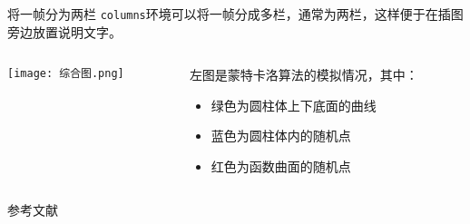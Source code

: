 \documentclass[14pt,hyperref={CJKbookmarks=true}]{beamer} %
\begin{document}
\begin{frame}{将一帧分为两栏}
    \texttt{columns}环境可以将一帧分成多栏，通常为两栏，这样便于在插图旁边放置说明文字。
    \begin{columns}[onlytextwidth]  %
        \begin{column}{0.55\textwidth}
            \texttt{[image: 综合图.png]}
        \end{column}
        \begin{column}{0.45\textwidth}
            左图是蒙特卡洛算法的模拟情况，其中：
            \begin{itemize}
                \item  绿色为圆柱体上下底面的曲线
                \item  蓝色为圆柱体内的随机点
                \item  红色为函数曲面的随机点
            \end{itemize}
        \end{column}
    \end{columns}
\end{frame}
\begin{frame}{参考文献}
    \begin{thebibliography}{10}

    \end{thebibliography}
\end{frame}
\end{document}
